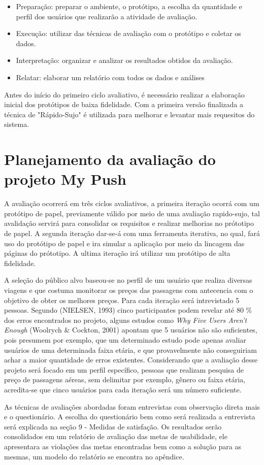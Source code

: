 \begin{itemize}
	\item Preparação: preparar o ambiente, o protótipo, a escolha da quantidade e perfil dos usuários que realizarão a atividade de avaliação.
	\item Execução: utilizar das técnicas de avaliação com o protótipo e coletar os dados.
	\item Interpretação: organizar e analizar os resultados obtidos da avaliação.
	\item Relatar: elaborar um relatório com todos os dados e análises
\end{itemize}

Antes do início do primeiro ciclo avaliativo, é necessário realizar a elaboração inicial dos protótipos de baixa fidelidade. Com a primeira versão finalizada a técnica de "Rápido-Sujo" é utilizada para melhorar e levantar mais requesitos do sistema.

\section{Planejamento da avaliação do projeto My Push}

A avaliação ocorrerá em três ciclos avaliativos, a primeira iteração ocorrá com um protótipo de papel, previamente válido por meio de uma avaliação rapido-sujo, tal avalidação servirá para consolidar os requisitos e realizar melhorias no prótotipo de papel. A segunda iteração dar-se-á com uma ferramenta iterativa, no qual, fará uso do protótipo de papel e ira simular a aplicação por meio da lincagem das páginas do prótotipo. A ultima iteração irá utilizar um protótipo de alta fidelidade.

A seleção do público alvo baseou-se no perfil de um usuário que realiza diversas viagens e que costuma monitorar os preços das passagens com antecencia com o objetivo de obter os melhores preços. Para cada iteração será intrevistado 5 pessoas. Segundo (NIELSEN, 1993) cinco participantes podem revelar até 80 \% dos erros encontrados no projeto, alguns estudos como \textit{Why Five Users Aren't Enough} (Woolrych \& Cockton, 2001) apontam que 5 usuários não são suficientes, pois presumem por exemplo, que um determinado estudo pode apenas avaliar usuários de uma determinada faixa etária, e que provavelmente não conseguiriam achar a maior quantidade de erros existentes. Considerando que a avaliação desse projeto será focado em um perfil específico, pessoas que realizam pesquisa de preço de passagens aéreas, sem delimitar por exemplo, gênero ou faixa etária, acredita-se que cinco usuários para cada iteração será um número suficiente.

As técnicas de avaliações abordadas foram entrevistas com observação direta mais e o questionário. A escolha do questionário bem como será realizada a entrevista será explicada na seção 9 - Medidas de satisfação. Os resultados serão consolidados em um relatório de avaliação das metas de usabilidade, ele apresentara as violações das metas encontradas bem como a solução para as mesmas, um modelo do relatório se encontra no apêndice.
